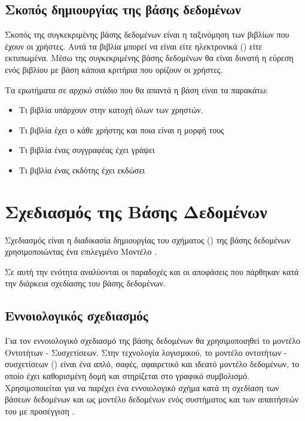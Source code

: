 \documentclass{assignment}
\begin{document}
\subsection{Σκοπός δημιουργίας της βάσης δεδομένων}

Σκοπός της συγκεκριμένης βάσης δεδομένων είναι η ταξινόμηση των βιβλίων που έχουν οι χρήστες. Αυτά τα βιβλία μπορεί να είναι είτε ηλεκτρονικά () είτε εκτυπωμένα. Μέσω της συγκεκριμένης βάσης δεδομένων  θα είναι δυνατή η εύρεση ενός βιβλίου με βάση κάποια κριτήρια που ορίζουν οι χρήστες. 

Τα ερωτήματα σε αρχικό στάδιο που θα απαντά η βάση είναι τα παρακάτω:
\begin{itemize}
  \item Τι βιβλία υπάρχουν στην κατοχή όλων των χρηστών.
  \item Τι βιβλία έχει ο κάθε χρήστης και ποια είναι η μορφή τους
  \item Τι βιβλία ένας συγγραφέας έχει γράψει
  \item Τι βιβλία ένας εκδότης έχει εκδώσει 
\end{itemize}

\section{Σχεδιασμός της Βάσης Δεδομένων}

Σχεδιασμός είναι η διαδικασία δημιουργίας του σχήματος () της βάσης δεδομένων χρησιμοποιώντας ένα επιλεγμένο Μοντέλο \cite{class_notes}.

Σε αυτή την ενότητα αναλύονται οι παραδοχές και οι αποφάσεις που πάρθηκαν κατά την διάρκεια σχεδίασης του βάσης δεδομένων.

\subsection{Εννοιολογικός σχεδιασμός}
\label{ERmodel}

Για τον εννοιολογικό σχεδιασμό της βάσης δεδομένων θα χρησιμοποιηθεί το μοντέλο Οντοτήτων - Συσχετίσεων.  Στην τεχνολογία λογισμικού, το μοντέλο οντοτήτων - συσχετίσεων () είναι ένα απλό, σαφές, αφαιρετικό και ιδεατό μοντέλο δεδομένων, το οποίο έχει καθορισμένη δομή και στηρίζεται στο γραφικό συμβολισμό. Χρησιμοποιείται για να παρέχει ένα εννοιολογικό σχήμα κατά τη σχεδίαση των βάσεων δεδομένων και ως μοντέλο δεδομένων ενός συστήματος και των απαιτήσεών του με  προσέγγιση \cite{wiki:Entity_relationship_model, class_notes}.
\end{document}
